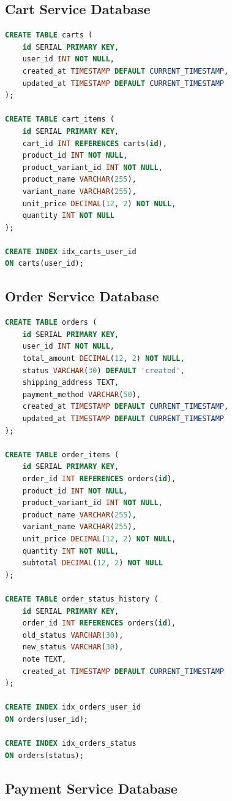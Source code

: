 \subsection{Cart Service Database}

\begin{lstlisting}[style=code,language=SQL]
CREATE TABLE carts (
    id SERIAL PRIMARY KEY,
    user_id INT NOT NULL,
    created_at TIMESTAMP DEFAULT CURRENT_TIMESTAMP,
    updated_at TIMESTAMP DEFAULT CURRENT_TIMESTAMP
);

CREATE TABLE cart_items (
    id SERIAL PRIMARY KEY,
    cart_id INT REFERENCES carts(id),
    product_id INT NOT NULL,
    product_variant_id INT NOT NULL,
    product_name VARCHAR(255),
    variant_name VARCHAR(255),
    unit_price DECIMAL(12, 2) NOT NULL,
    quantity INT NOT NULL
);

CREATE INDEX idx_carts_user_id
ON carts(user_id);
\end{lstlisting}

\subsection{Order Service Database}

\begin{lstlisting}[style=code,language=SQL]
CREATE TABLE orders (
    id SERIAL PRIMARY KEY,
    user_id INT NOT NULL,
    total_amount DECIMAL(12, 2) NOT NULL,
    status VARCHAR(30) DEFAULT 'created',
    shipping_address TEXT,
    payment_method VARCHAR(50),
    created_at TIMESTAMP DEFAULT CURRENT_TIMESTAMP,
    updated_at TIMESTAMP DEFAULT CURRENT_TIMESTAMP
);

CREATE TABLE order_items (
    id SERIAL PRIMARY KEY,
    order_id INT REFERENCES orders(id),
    product_id INT NOT NULL,
    product_variant_id INT NOT NULL,
    product_name VARCHAR(255),
    variant_name VARCHAR(255),
    unit_price DECIMAL(12, 2) NOT NULL,
    quantity INT NOT NULL,
    subtotal DECIMAL(12, 2) NOT NULL
);

CREATE TABLE order_status_history (
    id SERIAL PRIMARY KEY,
    order_id INT REFERENCES orders(id),
    old_status VARCHAR(30),
    new_status VARCHAR(30),
    note TEXT,
    created_at TIMESTAMP DEFAULT CURRENT_TIMESTAMP
);

CREATE INDEX idx_orders_user_id
ON orders(user_id);

CREATE INDEX idx_orders_status
ON orders(status);
\end{lstlisting}

\subsection{Payment Service Database}

